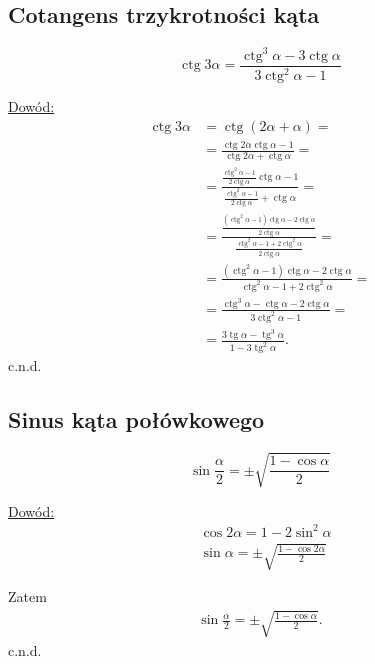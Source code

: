 \documentclass[12pt,a4paper,fleqn]{article}
\DeclareMathOperator{\tg}{tg}
\DeclareMathOperator{\ctg}{ctg}
\begin{document}
	\subsection{Cotangens trzykrotności kąta}
		\begin{equation*}
			\ctg3\alpha = \frac{\ctg^3\alpha - 3\ctg\alpha}{3\ctg^2\alpha-1}
		\end{equation*}
		
		\underline{Dowód:} \noindent
		\begin{align*}
			\ctg3\alpha &= \ctg(2\alpha + \alpha) = \\
					    &= \frac{\ctg2\alpha\ctg\alpha- 1}{\ctg2\alpha+\ctg\alpha} = \\
					   	&= \frac{\frac{\ctg^2\alpha-1}{2\ctg\alpha}\ctg\alpha- 1}{\frac{\ctg^2\alpha-1}{2\ctg\alpha}+\ctg\alpha} = \\
					   	&= \frac{\frac{(\ctg^2\alpha-1)\ctg\alpha-2\ctg\alpha}{2\ctg\alpha}}{\frac{\ctg^2\alpha-1+2\ctg^2\alpha}{2\ctg\alpha}} =\\
					   	&=\frac{(\ctg^2\alpha-1)\ctg\alpha-2\ctg\alpha}{\ctg^2\alpha-1+2\ctg^2\alpha} =\\
					   	&=\frac{\ctg^3\alpha-\ctg\alpha-2\ctg\alpha}{3\ctg^2\alpha-1} =\\
					   	&= \frac{3\tg\alpha-\tg^3\alpha}{1-3\tg^2\alpha}.
		\end{align*}
		c.n.d.

	\subsection{Sinus kąta połówkowego}
		\begin{equation*}
			\sin\frac{\alpha}{2} = \pm \sqrt{\frac{1-\cos\alpha}{2}}
		\end{equation*}
		
		\underline{Dowód:} \noindent
		\begin{align*}
			&\cos 2\alpha = 1 - 2\sin^2\alpha\\
			&\sin\alpha = \pm \sqrt{\frac{1-\cos2\alpha}{2}}
		\end{align*}
		
		Zatem
		\begin{align*}
			\sin\frac{\alpha}{2} = \pm \sqrt{\frac{1-\cos\alpha}{2}}.
		\end{align*}
		c.n.d.
		
\end{document}

